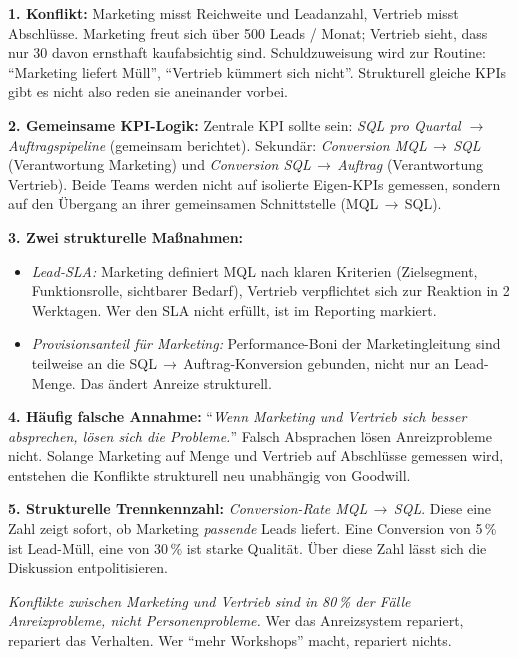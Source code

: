 \documentclass[11pt,a4paper,oneside]{article}
\begin{document}
\begin{loesungbox}
\textbf{1. Konflikt:}
Marketing misst Reichweite und Leadanzahl, Vertrieb misst Abschlüsse. Marketing freut sich über 500 Leads / Monat; Vertrieb sieht, dass nur 30 davon ernsthaft kaufabsichtig sind. Schuldzuweisung wird zur Routine: ``Marketing liefert Müll'', ``Vertrieb kümmert sich nicht''. Strukturell gleiche KPIs gibt es nicht \textendash{} also reden sie aneinander vorbei.

\textbf{2. Gemeinsame KPI-Logik:}
Zentrale KPI sollte sein: \emph{SQL pro Quartal $\rightarrow$ Auftragspipeline} (gemeinsam berichtet). Sekundär: \emph{Conversion MQL\,$\rightarrow$\,SQL} (Verantwortung Marketing) und \emph{Conversion SQL\,$\rightarrow$\,Auftrag} (Verantwortung Vertrieb). Beide Teams werden nicht auf isolierte Eigen-KPIs gemessen, sondern auf den Übergang an ihrer gemeinsamen Schnittstelle (MQL\,$\rightarrow$\,SQL).

\textbf{3. Zwei strukturelle Maßnahmen:}
\begin{itemize}
  \item \emph{Lead-SLA:} Marketing definiert MQL nach klaren Kriterien (Zielsegment, Funktionsrolle, sichtbarer Bedarf), Vertrieb verpflichtet sich zur Reaktion in 2 Werktagen. Wer den SLA nicht erfüllt, ist im Reporting markiert.
  \item \emph{Provisionsanteil für Marketing:} Performance-Boni der Marketingleitung sind teilweise an die SQL\,$\rightarrow$\,Auftrag-Konversion gebunden, nicht nur an Lead-Menge. Das ändert Anreize strukturell.
\end{itemize}

\textbf{4. Häufig falsche Annahme:}
``\emph{Wenn Marketing und Vertrieb sich besser absprechen, lösen sich die Probleme.}'' Falsch \textendash{} Absprachen lösen Anreizprobleme nicht. Solange Marketing auf Menge und Vertrieb auf Abschlüsse gemessen wird, entstehen die Konflikte strukturell neu \textendash{} unabhängig von Goodwill.

\textbf{5. Strukturelle Trennkennzahl:}
\emph{Conversion-Rate MQL\,$\rightarrow$\,SQL}. Diese eine Zahl zeigt sofort, ob Marketing \emph{passende} Leads liefert. Eine Conversion von 5\,\% ist Lead-Müll, eine von 30\,\% ist starke Qualität. Über diese Zahl lässt sich die Diskussion entpolitisieren.

\begin{merkbox}
\emph{Konflikte zwischen Marketing und Vertrieb sind in 80\,\% der Fälle Anreizprobleme, nicht Personenprobleme.} Wer das Anreizsystem repariert, repariert das Verhalten. Wer ``mehr Workshops'' macht, repariert nichts.
\end{merkbox}
\end{loesungbox}
\end{document}
